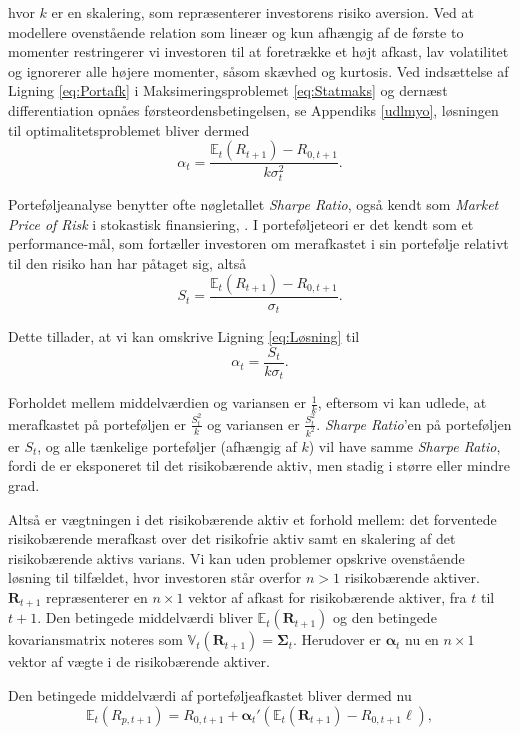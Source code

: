 \documentclass[
  a4paper,
  oneside]{memoir}
\begin{document}
hvor \(k\) er en skalering, som repræsenterer investorens risiko aversion. Ved at modellere ovenstående relation som lineær og kun afhængig af de første to momenter restringerer vi investoren til at foretrække et højt afkast, lav volatilitet og ignorerer alle højere momenter, såsom skævhed og kurtosis. Ved indsættelse af Ligning \eqref{eq:Portafk} i Maksimeringsproblemet \eqref{eq:Statmaks} og dernæst differentiation opnåes førsteordensbetingelsen, se Appendiks \ref{udlmyo}, løsningen til optimalitetsproblemet bliver dermed
\begin{equation}
\alpha_t = \frac{\mathbb{E}_t\left(R_{t+1}\right)-R_{0,t+1}}{k\sigma_t^2}.\label{eq:Løsning}
\end{equation}

Porteføljeanalyse benytter ofte nøgletallet \emph{Sharpe Ratio}, også kendt som \emph{Market Price of Risk} i stokastisk finansiering, \citep{Bjork2009}. I porteføljeteori er det kendt som et performance-mål, som fortæller investoren om merafkastet i sin portefølje relativt til den risiko han har påtaget sig, altså
\[S_t=\frac{\mathbb{E}_t(R_{t+1})-R_{0,t+1}}{\sigma_t}.\]

Dette tillader, at vi kan omskrive Ligning \eqref{eq:Løsning} til
\[\alpha_t=\frac{S_t}{k\sigma_t}.\]

Forholdet mellem middelværdien og variansen er \(\tfrac{1}{k}\), eftersom vi kan udlede, at merafkastet på porteføljen er \(\tfrac{S_t^2}{k}\) og variansen er \(\tfrac{S_t^2}{k^2}\). \emph{Sharpe Ratio}'en på porteføljen er \(S_t\), og alle tænkelige porteføljer (afhængig af \(k\)) vil have samme \emph{Sharpe Ratio}, fordi de er eksponeret til det risikobærende aktiv, men stadig i større eller mindre grad.

Altså er vægtningen i det risikobærende aktiv et forhold mellem: det forventede risikobærende merafkast over det risikofrie aktiv samt en skalering af det risikobærende aktivs varians. Vi kan uden problemer opskrive ovenstående løsning til tilfældet, hvor investoren står overfor \(n>1\) risikobærende aktiver. \(\bm{R}_{t+1}\) repræsenterer en \(n\times 1\) vektor af afkast for risikobærende aktiver, fra \(t\) til \(t+1\). Den betingede middelværdi bliver \(\mathbb{E}_t(\bm{R}_{t+1})\) og den betingede kovariansmatrix noteres som \(\mathbb{V}_t(\bm{R}_{t+1})=\bm{\Sigma}_t\). Herudover er \(\bm{\alpha}_t\) nu en \(n\times 1\) vektor af vægte i de risikobærende aktiver.

Den betingede middelværdi af porteføljeafkastet bliver dermed nu
\begin{equation}
\mathbb{E}_t(R_{p,t+1})=R_{0,t+1}+\bm{\alpha}_t'(\mathbb{E}_t(\bm{R}_{t+1})- R_{0,t+1}\bm{\ell}),
\end{equation}
\end{document}
